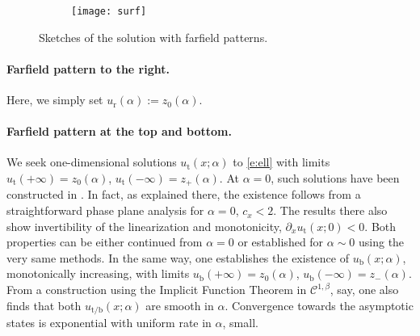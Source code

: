 \documentclass[10pt]{article}
\begin{document}
\begin{figure}[htb]
\centering
    \begin{subfigure}[b]{0.52\textwidth}
        \texttt{[image: surf]}
        \label{fig:Diagram_physical}
    \end{subfigure}
    \begin{subfigure}[b]{0.47\textwidth}
        \label{fig:mouse}
    \end{subfigure}
\caption{Sketches of the solution with farfield patterns. \label{Fig:H_infty}}
\end{figure}
%

\paragraph{Farfield pattern to the right.} Here, we simply set $u_\mathrm{r}(\alpha):=z_0(\alpha)$. 

\paragraph{Farfield pattern at the top and bottom.} We seek one-dimensional solutions $u_\mathrm{t}(x;\alpha)$ to \eqref{e:ell} with limits $u_\mathrm{t}(+\infty)=z_0(\alpha)$, $u_\mathrm{t}(-\infty)=z_+(\alpha)$. At $\alpha=0$, such solutions have been constructed in \cite[Prop. 1.4]{Monteiro_Scheel}. In fact, as explained there, the existence follows from a straightforward phase plane analysis for $\alpha=0$, $c_x<2$. The results there also show invertibility of the linearization and monotonicity, $\partial_x u_\mathrm{t}(x;0)<0$. Both properties can be either continued from $\alpha=0$ or established for $\alpha\sim 0$ using the very same methods. In the same way, one establishes the existence of $u_\mathrm{b}(x;\alpha)$, monotonically increasing, with  limits $u_\mathrm{b}(+\infty)=z_0(\alpha)$, $u_\mathrm{b}(-\infty)=z_-(\alpha)$. From a construction using the Implicit Function Theorem in $\mathcal{C}^{1,\beta}$, say, one also finds that both $u_\mathrm{t/b}(x;\alpha)$ are smooth in $\alpha$. Convergence towards the asymptotic states is exponential with uniform rate in $\alpha$, small. 
\end{document}
